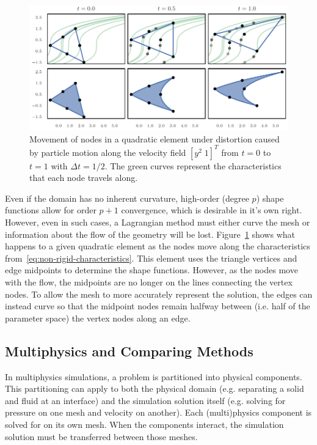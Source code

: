 \begin{figure}
  \includegraphics{../images/solution-transfer/element_distortion.pdf}
  \centering
  \captionsetup{width=.75\linewidth}
  \caption{Movement of nodes in a quadratic element under distortion caused
    by particle motion along the velocity field \(\left[ y^2 \; 1 \right]^T\)
    from \(t = 0\) to \(t = 1\) with \(\Delta t = 1/2\). The green curves
    represent the characteristics that each node travels along.}
  \label{fig:element-distortion}
\end{figure}

Even if the domain has no inherent curvature, high-order (degree \(p\)) shape
functions allow for order \(p + 1\) convergence, which is desirable in
it's own right. However, even in such cases, a Lagrangian method must either
curve the mesh or information about the flow of the geometry will be lost.
Figure~\ref{fig:element-distortion} shows what happens to a given
quadratic element as the nodes move along the
characteristics from~\eqref{eq:non-rigid-characteristics}.
This element uses the triangle vertices and edge
midpoints to determine the shape functions. However, as the nodes move
with the flow, the midpoints are no longer on the lines connecting
the vertex nodes. To allow the mesh to more accurately represent the
solution, the edges can instead curve so that the midpoint nodes remain
halfway between (i.e. half of the parameter space) the vertex nodes along
an edge.

\subsection{Multiphysics and Comparing Methods}

In multiphysics simulations, a problem is partitioned into physical components.
This partitioning can apply to both the physical domain (e.g. separating a
solid and fluid at an interface) and the simulation solution itself (e.g.
solving for pressure on one mesh and velocity on another). Each (multi)physics
component is solved for on its own mesh. When the components interact, the
simulation solution must be transferred between those meshes.

